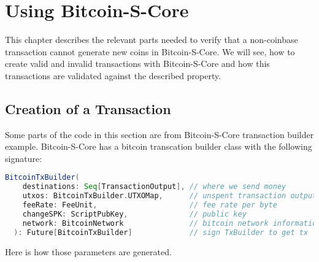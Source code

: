 \chapter{Using Bitcoin-S-Core}
\label{chap:using_bitcoins}
This chapter describes the relevant parts needed to verify that a non-coinbase transaction cannot generate new coins in Bitcoin-S-Core.
We will see, how to create valid and invalid transactions with Bitcoin-S-Core and how this transactions are validated against the described property.

\section{Creation of a Transaction}
Some parts of the code in this section are from Bitcoin-S-Core transaction builder example.\cite{BitcoinSCore:txbuilderexample}
Bitcoin-S-Core has a bitcoin transcation builder class with the following signature:
\begin{lstlisting}[language=scala]
  BitcoinTxBuilder(
    destinations: Seq[TransactionOutput], // where we send money
    utxos: BitcoinTxBuilder.UTXOMap,      // unspent transaction outputs
    feeRate: FeeUnit,                     // fee rate per byte
    changeSPK: ScriptPubKey,              // public key
    network: BitcoinNetwork               // bitcoin network information
  ): Future[BitcoinTxBuilder]             // sign TxBuilder to get tx
\end{lstlisting}
Here is how those parameters are generated.

